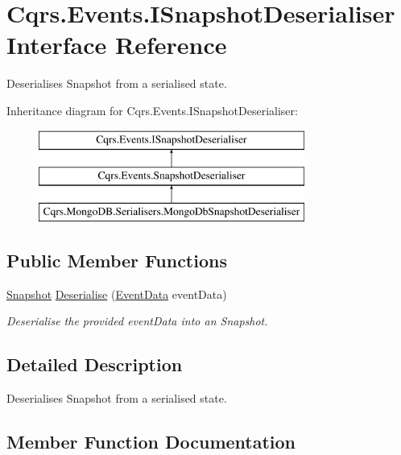 \hypertarget{interfaceCqrs_1_1Events_1_1ISnapshotDeserialiser}{}\section{Cqrs.\+Events.\+I\+Snapshot\+Deserialiser Interface Reference}
\label{interfaceCqrs_1_1Events_1_1ISnapshotDeserialiser}


Deserialises Snapshot from a serialised state.  


Inheritance diagram for Cqrs.\+Events.\+I\+Snapshot\+Deserialiser\+:\begin{figure}[H]
\begin{center}
\leavevmode
\includegraphics[height=3.000000cm]{interfaceCqrs_1_1Events_1_1ISnapshotDeserialiser}
\end{center}
\end{figure}
\subsection*{Public Member Functions}
\begin{DoxyCompactItemize}
\item 
\hyperlink{classCqrs_1_1Snapshots_1_1Snapshot}{Snapshot} \hyperlink{interfaceCqrs_1_1Events_1_1ISnapshotDeserialiser_af5520b6bc814efe3cc86e611afd390ae_af5520b6bc814efe3cc86e611afd390ae}{Deserialise} (\hyperlink{classCqrs_1_1Events_1_1EventData}{Event\+Data} event\+Data)
\begin{DoxyCompactList}\small\item\em Deserialise the provided {\itshape event\+Data}  into an Snapshot. \end{DoxyCompactList}\end{DoxyCompactItemize}


\subsection{Detailed Description}
Deserialises Snapshot from a serialised state. 



\subsection{Member Function Documentation}
\mbox{\label{interfaceCqrs_1_1Events_1_1ISnapshotDeserialiser_af5520b6bc814efe3cc86e611afd390ae_af5520b6bc814efe3cc86e611afd390ae}} 
